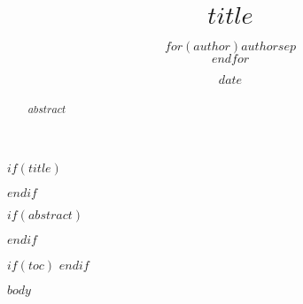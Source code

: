 \documentclass[$if(fontsize)$$fontsize$,$endif$$if(lang)$$babel-lang$,$endif$$if(papersize)$$papersize$paper,$endif$$if(beamer)$ignorenonframetext,$if(handout)$handout,$endif$$if(aspectratio)$aspectratio=$aspectratio$,$endif$$endif$$for(classoption)$$classoption$$sep$,$endfor$]{$documentclass$}
\title{\color{HTWGreenDark}$title$}
\author{$for(author)$$author$$sep$\\$endfor$}
\date{$date$}
\begin{document}
 $if(title)$
  \maketitle
 $endif$

 $if(abstract)$
 \begin{abstract}
  $abstract$
 \end{abstract}
 $endif$

 $if(toc)$
 \tableofcontents
 $endif$

 $body$
\end{document}
